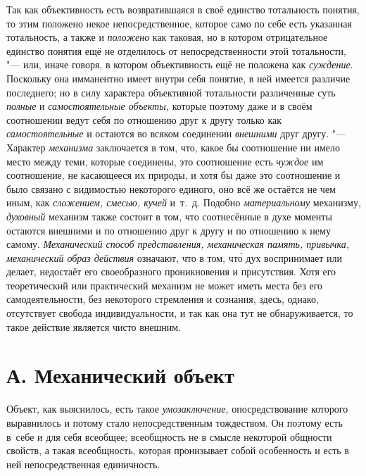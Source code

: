 Так как объективность есть возвратившаяся в своё единство
тотальность понятия, то этим положено некое непосредственное, которое само
по себе есть указанная тотальность, а также и {\em положено} как
таковая, но в котором отрицательное единство понятия ещё не отделилось от
непосредственности этой тотальности, "--- или, иначе говоря, в
котором объективность ещё не положена как {\em суждение}. Поскольку
она имманентно имеет внутри себя понятие, в ней имеется различие
последнего; но в силу характера объективной тотальности различенные суть
{\em полные} и {\em самостоятельные объекты,}
которые поэтому даже и в своём соотношении ведут себя по
отношению друг к другу только как {\em самостоятельные} и
остаются во всяком соединении {\em внешними} друг другу. "--- Характер
{\em механизма} заключается в том, что, какое бы соотношение ни имело место
между теми, которые соединены, это соотношение есть {\em чуждое} им
соотношение, не касающееся их природы, и хотя бы даже это соотношение и
было связано с видимостью некоторого единого, оно всё же остаётся не чем
иным, как {\em сложением, смесью, кучей} и~т.~д. Подобно {\em материальному}
механизму, {\em духовный}
механизм также состоит в том, что соотнесённые в духе моменты
остаются внешними и по отношению друг к другу и по отношению к нему самому.
{\em Механический способ представления, механическая память,
привычка, механический образ действия} означают, что в том,
чт\'{о} дух воспринимает или делает, недостаёт его
своеобразного проникновения и присутствия. Хотя его
теоретический или практический механизм не может иметь места без его
самодеятельности, без некоторого стремления и сознания, здесь, однако,
отсутствует свобода индивидуальности, и так как она тут не обнаруживается,
то такое действие является чисто внешним.

\section[А. Механический объект]{А. Механический объект}

Объект, как выяснилось, есть такое {\em умозаключение,}
опосредствование которого выравнилось и потому стало непосредственным
тождеством. Он поэтому есть в~себе и для себя всеобщее; всеобщность не в
смысле некоторой общности свойств, а такая всеобщность, которая пронизывает
собой особенность и есть в ней непосредственная единичность.

